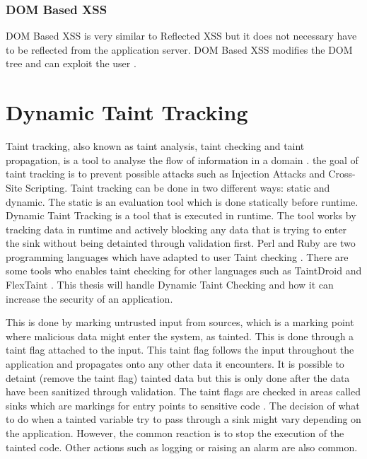 \subsubsection{DOM Based XSS}
DOM Based XSS is very similar to Reflected XSS but it does not necessary have to be reflected from the application server. DOM Based XSS modifies the DOM tree and can exploit the user \parencite{Secure_Web}.


\section{Dynamic Taint Tracking}
\label{DynamicTaintTracking}
Taint tracking, also known as taint analysis, taint checking and taint propagation, is a tool to analyse the flow of information in a domain \parencite{Pan2015}. the goal of taint tracking is to prevent possible attacks such as Injection Attacks and Cross-Site Scripting. Taint tracking can be done in two different ways: static and dynamic. The static is an evaluation tool which is done statically before runtime. Dynamic Taint Tracking is a tool that is executed in runtime. The tool works by tracking data in runtime and actively blocking any data that is trying to enter the sink without being detainted through validation first. Perl and Ruby are two programming languages which have adapted to user Taint checking \parencite{perl, ruby}. There are some tools who enables taint checking for other languages such as TaintDroid \parencite{Ma2010} and FlexTaint \parencite{Venkataramani2008}. This thesis will handle Dynamic Taint Checking and how it can increase the security of an application.

This is done by marking untrusted input from sources, which is a marking point where malicious data might enter the system, as tainted. This is done through a taint flag attached to the input. This taint flag follows the input throughout the application and propagates onto any other data it encounters. It is possible to detaint (remove the taint flag) tainted data but this is only done after the data have been sanitized through validation. The taint flags are checked in areas called sinks which are markings for entry points to sensitive code \parencite{Pan2015, Venkataramani2008}. The decision of what to do when a tainted variable try to pass through a sink might vary depending on the application. However, the common reaction is to stop the execution of the tainted code. Other actions such as logging or raising an alarm are also common.

